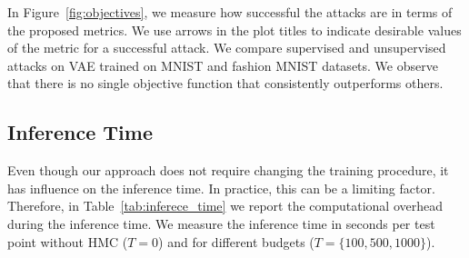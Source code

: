 
In Figure~\ref{fig:objectives}, we measure how successful the attacks are in terms of the proposed metrics. We use arrows in the plot titles to indicate desirable values of the metric for a successful attack. We compare supervised and unsupervised attacks on VAE trained on MNIST and fashion MNIST datasets. We observe that there is no single objective function that consistently outperforms others. 


\subsection{Inference Time} \label{appendix:inference_time}


Even though our approach does not require changing the training procedure, it has influence on the inference time. In practice, this can be a limiting factor. Therefore, in Table~\ref{tab:inferece_time} we report the computational overhead during the inference time. We measure the inference time in seconds per test point without HMC ($T=0$) and for different budgets ($T=\{100, 500, 1000\}$). 


